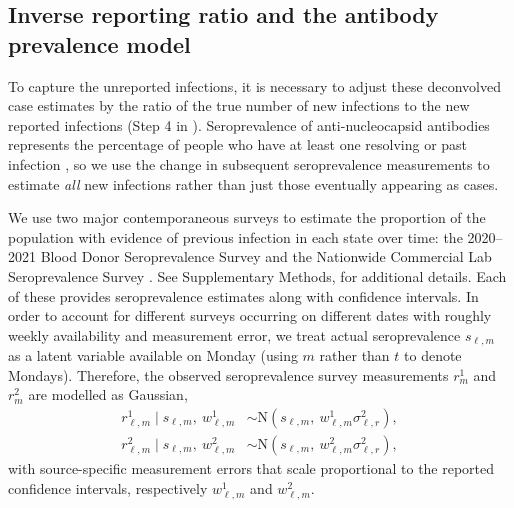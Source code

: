 \subsection{Inverse reporting ratio and the antibody prevalence model} 
\label{sec:report-ratio}

To capture the unreported infections, it is necessary to adjust these
deconvolved case estimates by the ratio of the true number of new infections to
the new reported infections (Step 4 in ). 
Seroprevalence of anti-nucleocapsid antibodies represents the percentage
of people who have at least one resolving or past infection \citep{cdc2020data},
so we use the change in subsequent seroprevalence measurements to estimate
\emph{all} new infections rather than just those eventually appearing as cases.

We use two major contemporaneous surveys to estimate the proportion of the
population with evidence of previous infection in each state over time: the
2020--2021 Blood Donor Seroprevalence Survey and the Nationwide Commercial Lab
Seroprevalence Survey \citep{cdc2021blood, cdc2021comm}. See Supplementary
Methods,  for additional details. Each of these provides
seroprevalence estimates along with confidence intervals. In order to account
for different surveys occurring on different dates with roughly weekly
availability and measurement error, we treat actual seroprevalence $s_{\ell,m}$
as a latent variable available on Monday (using $m$ rather than $t$ to denote
Mondays). Therefore, the observed seroprevalence survey measurements $r^1_m$ and
$r^2_m$ are modelled as Gaussian,
\begin{align}
\label{eq:sero-measurements}
r^1_{\ell,m} \mid s_{\ell,m},\ w^1_{\ell,m} &\sim \textrm{N}(s_{\ell,m},\ w^1_{\ell,m}\sigma^2_{\ell,r}),\\
r^2_{\ell,m} \mid s_{\ell,m},\  w^2_{\ell,m}
  &\sim \textrm{N}(s_{\ell,m},\ w^2_{\ell,m}\sigma^2_{\ell,r}),
\end{align}
with source-specific measurement errors that scale proportional to the reported
confidence intervals, respectively $w^1_{\ell,m}$ and $w^2_{\ell,m}$.  


